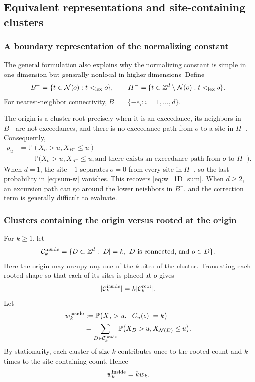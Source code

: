 \documentclass[aap,preprint]{imsart}
\theoremstyle{plain}
\theoremstyle{definition}
\def\P{{\mathbb P}}
\def\Z{{\mathbb Z}}
\begin{document}
	\subsection{Equivalent representations and site-containing clusters}
	
	\subsubsection{A boundary representation of the normalizing constant}
	
	The general formulation also explains why the normalizing constant is simple
	in one dimension but generally nonlocal in higher dimensions.  Define
	\[
	B^-=\{t\in\mathcal{N}(o):t<_{\rm lex}o\},
	\qquad
	H^-=\{t\in\Z^d\setminus \mathcal{N}(o):t<_{\rm lex}o\}.
	\]
	For nearest-neighbor connectivity, $B^-=\{-e_i:i=1,\ldots,d\}$.  
	
	The origin is a cluster root precisely when it is an exceedance, its neighbors
	in $B^-$ are not exceedances, and there is no exceedance path from $o$ to a
	site in $H^-$.  Consequently,
	\begin{equation}\label{eq:sum-w}
		\begin{split}
			\rho_u
			&=\P(X_o>u,X_{B^-}\le u)\\
			&\quad-
			\P\bigl(X_o>u,X_{B^-}\le u,
			\text{and there exists an exceedance path from $o$ to $H^-$}\bigr).
		\end{split}
	\end{equation}
	When $d=1$, the site $-1$ separates $o=0$ from every site in $H^-$, so the
	last probability in \eqref{eq:sum-w} vanishes.  This recovers
	\eqref{eq:w_1D_sum}.  When $d\ge2$, an excursion path can go around the lower
	neighbors in $B^-$, and the correction term is generally difficult to
	evaluate.
	
	\subsubsection{Clusters containing the origin versus rooted at the origin}
	
	For $k\ge1$, let
	\[
	\mathcal{C}_k^{\rm inside}
	=\{D\subset\Z^d:|D|=k,\ D\text{ is connected, and }o\in D\}.
	\]
	Here the origin may occupy any one of the $k$ sites of the cluster.  Translating
	each rooted shape so that each of its sites is placed at $o$ gives
	\begin{equation}\label{eq:C-inside}
		|\mathcal{C}_k^{\rm inside}|=k|\mathcal{C}_k^{\rm root}|.
	\end{equation}
	Let
	\begin{equation}\label{eq:w-inside}
		\begin{split}
			w_k^{\rm inside}
			&:=\P\bigl(X_o>u,\ |C_u(o)|=k\bigr)\\
			&=\sum_{D\in\mathcal{C}_k^{\rm inside}}
			\P\bigl(X_D>u,X_{\mathcal{N}(D)}\le u\bigr).
		\end{split}
	\end{equation}
	By stationarity, each cluster of size $k$ contributes once to the rooted count
	and $k$ times to the site-containing count.  Hence
	\begin{equation}\label{eq:w-inside-w}
		w_k^{\rm inside}=kw_k.
	\end{equation}
	
\end{document}
